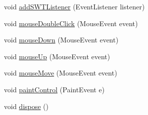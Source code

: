 \begin{DoxyCompactItemize}
\item 
void \mbox{\hyperlink{classorg_1_1jfree_1_1experimental_1_1chart_1_1swt_1_1_chart_composite_a1882454eb89cffce02813f900386c687}{add\+S\+W\+T\+Listener}} (Event\+Listener listener)
\item 
void \mbox{\hyperlink{classorg_1_1jfree_1_1experimental_1_1chart_1_1swt_1_1_chart_composite_ab603fe7f19e09700cdbbd64b4d146bd3}{mouse\+Double\+Click}} (Mouse\+Event event)
\item 
void \mbox{\hyperlink{classorg_1_1jfree_1_1experimental_1_1chart_1_1swt_1_1_chart_composite_a95cb954a21ccc29d98dc18e6d8694299}{mouse\+Down}} (Mouse\+Event event)
\item 
void \mbox{\hyperlink{classorg_1_1jfree_1_1experimental_1_1chart_1_1swt_1_1_chart_composite_aad0a6c76ea5fbd285b015b9c1922412d}{mouse\+Up}} (Mouse\+Event event)
\item 
void \mbox{\hyperlink{classorg_1_1jfree_1_1experimental_1_1chart_1_1swt_1_1_chart_composite_afe4e6c13b49e4f7b0242a1c5fb3f6393}{mouse\+Move}} (Mouse\+Event event)
\item 
void \mbox{\hyperlink{classorg_1_1jfree_1_1experimental_1_1chart_1_1swt_1_1_chart_composite_aec0cf3ffc9305c4cde48314e1ccd7579}{paint\+Control}} (Paint\+Event e)
\item 
void \mbox{\hyperlink{classorg_1_1jfree_1_1experimental_1_1chart_1_1swt_1_1_chart_composite_a7a68a7808164d95f98345cdc8a0e3bbc}{dispose}} ()
\end{DoxyCompactItemize}
